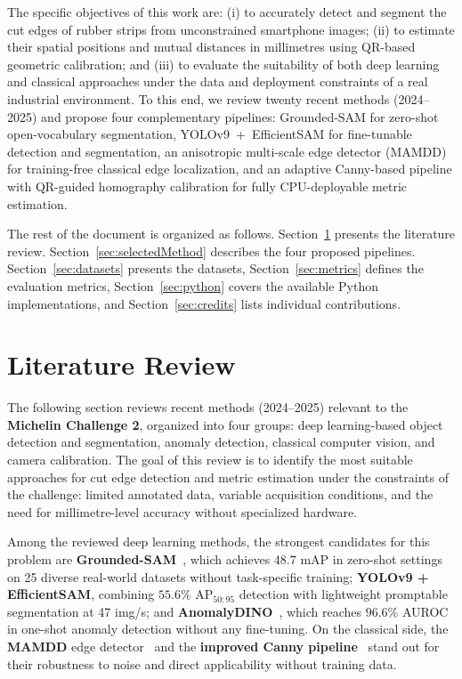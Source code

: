 \documentclass[11pt]{article}
\begin{document}
The specific objectives of this work are: (i) to accurately detect and segment the 
cut edges of rubber strips from unconstrained smartphone images; (ii) to estimate 
their spatial positions and mutual distances in millimetres using QR-based geometric 
calibration; and (iii) to evaluate the suitability of both deep learning and 
classical approaches under the data and deployment constraints of a real industrial 
environment. To this end, we review twenty recent methods (2024--2025) and propose 
four complementary pipelines: Grounded-SAM for zero-shot open-vocabulary 
segmentation, YOLOv9~+~EfficientSAM for fine-tunable detection and segmentation, 
an anisotropic multi-scale edge detector (MAMDD) for training-free classical edge 
localization, and an adaptive Canny-based pipeline with QR-guided homography 
calibration for fully CPU-deployable metric estimation.

The rest of the document is organized as follows. 
Section~\ref{sec:literatureReview} presents the literature review. 
Section~\ref{sec:selectedMethod} describes the four proposed pipelines. 
Section~\ref{sec:datasets} presents the datasets, Section~\ref{sec:metrics} 
defines the evaluation metrics, Section~\ref{sec:python} covers the available 
Python implementations, and Section~\ref{sec:credits} lists individual 
contributions.
\section{Literature Review}
\label{sec:literatureReview}

The following section reviews recent methods (2024--2025) relevant to the
\textbf{Michelin Challenge 2}, organized into four groups: deep learning-based
object detection and segmentation, anomaly detection, classical computer vision,
and camera calibration. The goal of this review is to identify the most suitable
approaches for cut edge detection and metric estimation under the constraints of
the challenge: limited annotated data, variable acquisition conditions, and
the need for millimetre-level accuracy without specialized hardware.

Among the reviewed deep learning methods, the strongest candidates for this
problem are \textbf{Grounded-SAM}~\cite{RenGroundedSAM2024}, which achieves
$48.7$ mAP in zero-shot settings on 25 diverse real-world datasets without
task-specific training; \textbf{YOLOv9 + EfficientSAM}, combining $55.6\%$
AP$_{50:95}$ detection with lightweight promptable segmentation at 47 img/s;
and \textbf{AnomalyDINO}~\cite{Damm2024AnomalyDINO}, which reaches $96.6\%$
AUROC in one-shot anomaly detection without any fine-tuning. On the classical
side, the \textbf{MAMDD} edge detector~\cite{Liang2025} and the
\textbf{improved Canny pipeline}~\cite{Liu2024b} stand out for their
robustness to noise and direct applicability without training data.
\end{document}
